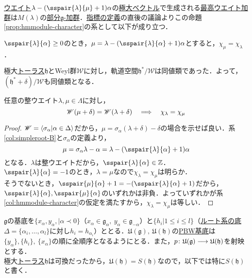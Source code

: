\documentclass[rep_main]{subfiles}
\begin{document}
\hyperref[def:weight-rep]{ウエイト}$\lambda - (\sspair{\lambda}{\mu}+1)\alpha$の\hyperref[def:maximal-vector-rep]{極大ベクトル}で生成される\hyperref[def:highest-weight-module]{最高ウエイト加群}は$M(\lambda)$の\hyperref[def:sub-g-module]{部分$\mathfrak{g}$-加群}．\hyperref[def:character]{指標の定義}の直後の議論よりこの命題\ref{prop:hmmodule-character}の系として以下が成り立つ．
\begin{mycol}[label=col:hmmodule-character]{}
	$\sspair{\lambda}{\alpha} \geq 0$のとき，$\mu = \lambda - (\sspair{\lambda}{\alpha}+1)\alpha$とすると，$\chi_\mu = \chi_\lambda$．
\end{mycol}
極大\hyperref[def:toral-subLieAlg]{トーラス}$\mathfrak{h}$とWeyl群$\mathscr{W}$に対し，軌道空間$\mathfrak{h}^* / \mathscr{W}$は同値類であった．よって，$(\mathfrak{h}^* + \delta) / \mathscr{W}$も同値類となる．
\begin{mycol}[label=col:hmmodule-character-2]{}
	任意の整ウエイト$\lambda, \mu \in \Lambda$に対し，
	\begin{equation}
		\mathscr{W}(\mu + \delta) = \mathscr{W}(\lambda + \delta)  \quad \Longrightarrow \quad  \chi_\lambda = \chi_\mu
	\end{equation}
\end{mycol}
\begin{proof}
	$\mathscr{W} = \ev{\sigma_\alpha | \alpha \in \Delta}$だから，$\mu = \sigma_\alpha(\lambda + \delta) - \delta$の場合を示せば良い．系\ref{col:simpleroot-B}と$\sigma_\alpha$の定義より，
	\begin{equation}
		\mu = \sigma_\alpha\lambda - \alpha = \lambda - (\sspair{\lambda}{\alpha} + 1)\alpha
	\end{equation}
	となる．$\lambda$は整ウエイトだから，$\sspair{\lambda}{\alpha} \in \mathbb{Z}$．\\
	$\sspair{\lambda}{\alpha} = -1$のとき，$\lambda = \mu$なので$\chi_\lambda = \chi_\mu$は明らか．\\
	そうでないとき，$\sspair{\mu}{\alpha} + 1 = -(\sspair{\lambda}{\alpha} + 1)$だから，$\sspair{\lambda}{\alpha}, \sspair{\mu}{\alpha}$のいずれかは非負．よっていずれかが系\ref{col:hmmodule-character}の仮定を満たすから，$\chi_\lambda = \chi_\mu$は等しい．
\end{proof}
$\mathfrak{g}$の基底を$\{x_\alpha, y_\alpha, | \alpha \prec 0\}$（$x_\alpha \in \mathfrak{g}_\alpha,\ y_\alpha \in \mathfrak{g}_{-\alpha}$）と$\{h_i | 1 \leq i \leq l\}$（\hyperref[def:base-root]{ルート系の底}$\Delta = \{\alpha_i, \ldots, \alpha_l\}$に対し$h_i = h_{\alpha_i}$）ととる．$\mathfrak{U}(\mathfrak{g}),\ \mathfrak{U}(\mathfrak{h})$の\hyperref[col:PBW-C]{PBW基底}は$\{y_\alpha\}, \{h_i\},\ \{x_\alpha\}$の順に全順序となるようにとる．また，$p\colon \mathfrak{U}(\mathfrak{g}) \longrightarrow \mathfrak{U}(\mathfrak{h})$を射映とする．\\
極大\hyperref[def:toral-subLieAlg]{トーラス}$\mathfrak{h}$は可換だったから，$\mathfrak{U}(\mathfrak{h}) = S(\mathfrak{h})$なので，以下では特に$S(\mathfrak{h})$と書く．
\end{document}
